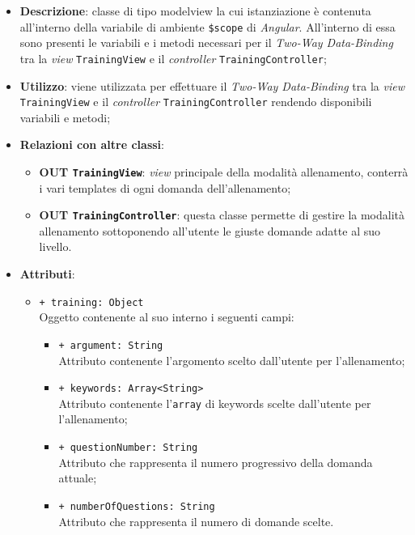 	\begin{itemize}
		\item \textbf{Descrizione}: classe di tipo modelview la cui istanziazione è contenuta all'interno della variabile di ambiente \texttt{\$scope} di \textit{Angular}. All'interno di essa sono presenti le variabili e i metodi necessari per il \textit{Two-Way Data-Binding} tra la \textit{view} \texttt{TrainingView} e il \textit{controller} \texttt{TrainingController};
		\item \textbf{Utilizzo}: viene utilizzata per effettuare il \textit{Two-Way Data-Binding} tra la \textit{view}\\ \texttt{TrainingView} e il \textit{controller} \texttt{TrainingController} rendendo disponibili variabili e metodi;
		\item \textbf{Relazioni con altre classi}: 
		\begin{itemize}
			\item \textbf{OUT \texttt{TrainingView}}: \textit{view} principale della modalità allenamento, conterrà i vari templates di ogni domanda dell'allenamento; 
			\item \textbf{OUT \texttt{TrainingController}}: questa classe permette di gestire la modalità allenamento sottoponendo all'utente le giuste domande adatte al suo livello.
		\end{itemize}
		\item \textbf{Attributi}: 
		\begin{itemize}
			\item \texttt{+ training: Object} \\ Oggetto contenente al suo interno i seguenti campi:
			\begin{itemize}
				\item \texttt{+ argument: String} \\ Attributo contenente l'argomento scelto dall'utente per l'allenamento;
				\item \texttt{+ keywords: Array<String>} \\ Attributo contenente l'\texttt{array} di keywords scelte dall'utente per l'allenamento;
				\item \texttt{+ questionNumber: String} \\ Attributo che rappresenta il numero progressivo della domanda attuale;
				\item \texttt{+ numberOfQuestions: String} \\ Attributo che rappresenta il numero di domande scelte.
			\end{itemize}

\end{itemize}
\end{itemize}

